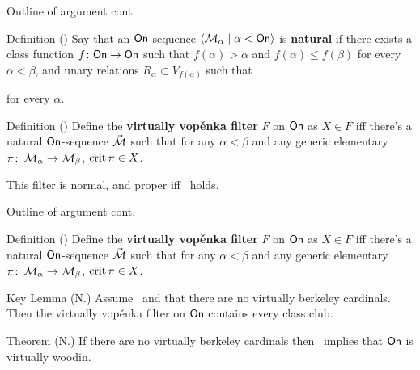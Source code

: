 \begin{frame}{Outline of argument cont.}
  \begin{block}{Definition (\gbc)}
    Say that an $\textsf{On}$-sequence $\langle \operatorname{\mathcal M}_\alpha\mid\alpha<\textsf{On}\rangle$ is \textbf{natural} if there exists a class function $f\colon\textsf{On}\to\textsf{On}$ such that $f(\alpha)>\alpha$ and $f(\alpha)\leq f(\beta)$ for every $\alpha<\beta$, and unary relations $R_\alpha\subset V_{f(\alpha)}$ such that

    for every $\alpha$.
  \end{block}

  \pause

  \begin{block}{Definition (\gbc)}
    Define the \textbf{virtually vop\v enka filter} $F$ on $\textsf{On}$ as $X\in F$ iff there's a natural $\textsf{On}$-sequence $\vec{\operatorname{\mathcal M}}$ such that for any $\alpha<\beta$ and any generic elementary $\pi\colon\operatorname{\mathcal M}_\alpha\to\operatorname{\mathcal M}_\beta$, $\operatorname{crit}\pi\in X$.
  \end{block}

  \pause

  This filter is normal, and proper iff \gvp\ holds.

\end{frame}

\begin{frame}{Outline of argument cont.}

  \begin{block}{Definition (\gbc)}
    Define the \textbf{virtually vop\v enka filter} $F$ on $\textsf{On}$ as $X\in F$ iff there's a natural $\textsf{On}$-sequence $\vec{\operatorname{\mathcal M}}$ such that for any $\alpha<\beta$ and any generic elementary $\pi\colon\operatorname{\mathcal M}_\alpha\to\operatorname{\mathcal M}_\beta$, $\operatorname{crit}\pi\in X$.
  \end{block}

  \pause

  \begin{block}{Key Lemma (N.)}
    Assume \gvp\ and that there are no virtually berkeley cardinals. Then the virtually vop\v enka filter on $\textsf{On}$ contains every class club.
  \end{block}

  \pause

  \begin{block}{Theorem (N.)}
    If there are no virtually berkeley cardinals then \gvp\ implies that $\textsf{On}$ is virtually woodin.
  \end{block}
\end{frame}

